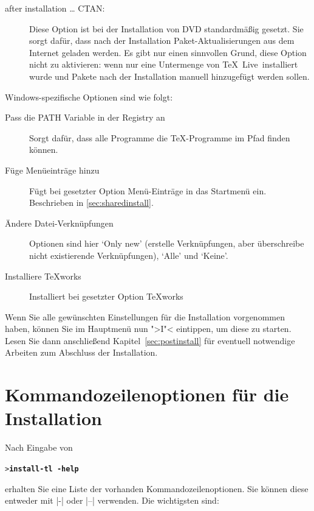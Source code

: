 \documentclass[12pt,ngerman,a4paper,fullparskip]{scrreprt}
\newcommand{\TL}{\TeX\ Live\xspace}
\newcommand{\Ucom}[1]{\textbf{\texttt{#1}}}
\begin{document}
\begin{description}
\item[after installation \dots{} CTAN:] Diese Option ist bei der Installation von DVD standardmäßig gesetzt. Sie sorgt dafür, dass nach der Installation Paket-Ak\-tuali\-sie\-rungen aus dem Internet geladen werden. Es gibt nur einen sinnvollen Grund, diese Option nicht zu aktivieren: wenn nur eine Untermenge von \TL\ installiert wurde und Pakete nach der Installation manuell hinzugefügt werden sollen.
\end{description}

Windows-spezifische Optionen sind wie folgt: 

\begin{description}
\item[Pass die PATH Variable in der Registry an] Sorgt dafür, dass alle Programme die \TeX-Programme im Pfad finden können.

\item[Füge Menüeinträge hinzu] Fügt bei gesetzter Option Menü-Einträge in das Startmenü ein.
Beschrieben in \ref{sec:sharedinstall}.

\item[Ändere Datei-Verknüpfungen] Optionen sind hier `Only new' (erstelle Verknüpfungen, aber überschreibe nicht existierende Verknüpfungen), `Alle' und `Keine'.

\item[Installiere \TeX{}works] Installiert bei gesetzter Option \TeX works
\end{description}

\noindent Wenn Sie alle gewünschten Einstellungen für die Installation vorgenommen haben, können Sie im Hauptmenü nun ">I"< eintippen, um diese zu starten. Lesen Sie dann anschließend Kapitel~\ref{sec:postinstall} für
eventuell notwendige Arbeiten zum Abschluss der Installation.

\section{Kommandozeilenoptionen für die Installation}\label{sec:cmdline}


Nach Eingabe von
\begin{alltt}
> \Ucom{install-tl -help}
\end{alltt}
erhalten Sie eine Liste der vorhanden Kommando\-zeilen\-optionen.  Sie können diese entweder mit |-| oder |--|
verwenden. Die wichtigsten sind:
\end{document}
